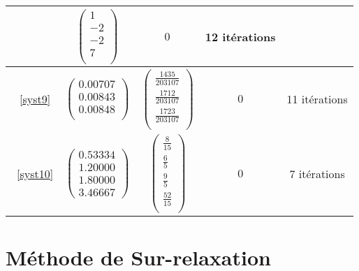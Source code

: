 \documentclass{report}
\begin{document}
\begin{tabular}{|c|c|c|c|c|}
           &
           $\begin{pmatrix}
              1 \\
              -2 \\
              -2 \\
              7 \\
          \end{pmatrix}$
          &
          $0$
          &
          12 itérations \\
           \hline
           ~\eqref{syst9}
           &
           $\begin{pmatrix}
              0.00707 \\
              0.00843 \\
              0.00848 \\
          \end{pmatrix}$
           &
           $\begin{pmatrix}
              \frac{1435}{203107} \\
              \frac{1712}{203107} \\
              \frac{1723}{203107} \\
          \end{pmatrix}$
          &
          $0$
          &
          11 itérations \\
           \hline
           ~\eqref{syst10}
           &
           $\begin{pmatrix}
              0.53334 \\
              1.20000 \\
              1.80000 \\
              3.46667
          \end{pmatrix}$
           &
           $\begin{pmatrix}
              \frac{8}{15} \\
              \frac{6}{5} \\
              \frac{9}{5} \\
              \frac{52}{15} \\
          \end{pmatrix}$
          &
          $0$
          &
          7 itérations \\
          \hline
         \end{tabular}
         \renewcommand{\arraystretch}{1}
  	\newpage
  	\section{Méthode de Sur-relaxation}
\end{document}
